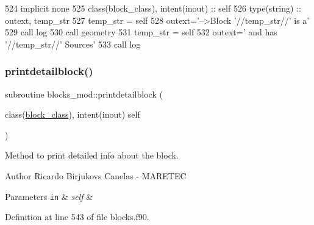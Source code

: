 \begin{DoxyCode}
524     \textcolor{keywordtype}{implicit none}
525     \textcolor{keywordtype}{class}(block\_class), \textcolor{keywordtype}{intent(inout)} :: self
526     \textcolor{keywordtype}{type}(string) :: outext, temp\_str
527     temp\_str = self%
528     outext=\textcolor{stringliteral}{'-->Block '}//temp\_str//\textcolor{stringliteral}{' is a'}
529     \textcolor{keyword}{call }log%
530     \textcolor{keyword}{call }geometry%
531     temp\_str = self%
532     outext=\textcolor{stringliteral}{'      and has '}//temp\_str//\textcolor{stringliteral}{' Sources'}
533     \textcolor{keyword}{call }log%
\end{DoxyCode}
\mbox{\label{namespaceblocks__mod_a10f356706988c45a255922fe70851488}} 
\subsubsection{\texorpdfstring{printdetailblock()}{printdetailblock()}}
{\footnotesize\ttfamily subroutine blocks\+\_\+mod\+::printdetailblock (\begin{DoxyParamCaption}\item[{class(\mbox{\hyperlink{structblocks__mod_1_1block__class}{block\+\_\+class}}), intent(inout)}]{self }\end{DoxyParamCaption})\hspace{0.3cm}{\ttfamily [private]}}



Method to print detailed info about the block. 

\begin{DoxyAuthor}{Author}
Ricardo Birjukovs Canelas -\/ M\+A\+R\+E\+T\+EC 
\end{DoxyAuthor}

\begin{DoxyParams}[1]{Parameters}
\mbox{\tt in}  & {\em self} & \\
\hline
\end{DoxyParams}


Definition at line 543 of file blocks.\+f90.


